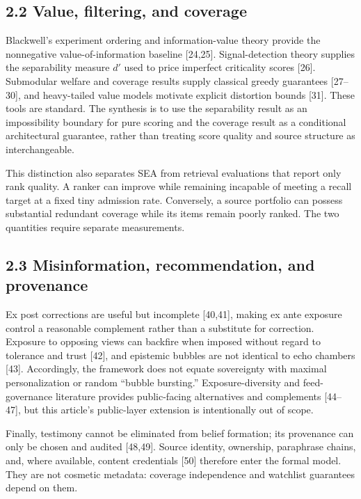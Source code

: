 \documentclass[
  11pt]{article}
\begin{document}
\subsection{2.2 Value, filtering, and coverage}\label{value-filtering-and-coverage}

Blackwell's experiment ordering and information-value theory provide the nonnegative value-of-information baseline {[}24,25{]}. Signal-detection theory supplies the separability measure \(d'\) used to price imperfect criticality scores {[}26{]}. Submodular welfare and coverage results supply classical greedy guarantees {[}27--30{]}, and heavy-tailed value models motivate explicit distortion bounds {[}31{]}. These tools are standard. The synthesis is to use the separability result as an impossibility boundary for pure scoring and the coverage result as a conditional architectural guarantee, rather than treating score quality and source structure as interchangeable.

This distinction also separates SEA from retrieval evaluations that report only rank quality. A ranker can improve while remaining incapable of meeting a recall target at a fixed tiny admission rate. Conversely, a source portfolio can possess substantial redundant coverage while its items remain poorly ranked. The two quantities require separate measurements.

\subsection{2.3 Misinformation, recommendation, and provenance}\label{misinformation-recommendation-and-provenance}

Ex post corrections are useful but incomplete {[}40,41{]}, making ex ante exposure control a reasonable complement rather than a substitute for correction. Exposure to opposing views can backfire when imposed without regard to tolerance and trust {[}42{]}, and epistemic bubbles are not identical to echo chambers {[}43{]}. Accordingly, the framework does not equate sovereignty with maximal personalization or random ``bubble bursting.'' Exposure-diversity and feed-governance literature provides public-facing alternatives and complements {[}44--47{]}, but this article's public-layer extension is intentionally out of scope.

Finally, testimony cannot be eliminated from belief formation; its provenance can only be chosen and audited {[}48,49{]}. Source identity, ownership, paraphrase chains, and, where available, content credentials {[}50{]} therefore enter the formal model. They are not cosmetic metadata: coverage independence and watchlist guarantees depend on them.
\end{document}
